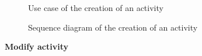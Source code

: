\documentclass[12pt,titlepage]{article}
\begin{document}
\pagebreak
\begin{figure}
\centering
{}
\caption{Use case of the creation of an activity}
\end{figure}
\begin{figure}
\centering
{} 
\caption{Sequence diagram of the creation of an activity}
\end{figure}
\clearpage
\newpage


\begin{flushleft}
\textbf{Modify activity}
\end{flushleft}
\end{document}
